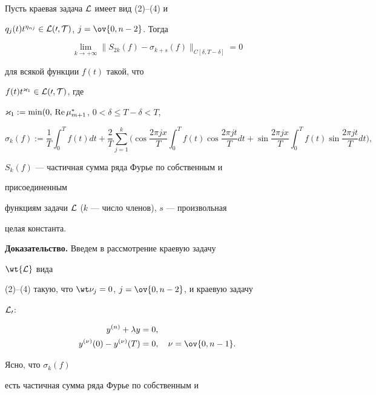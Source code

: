 \begin{cornonum}


Пусть краевая задача $\cal L$ имеет вид (2)--(4) и


$q_j(t)t^{\eta_{nj}}\in\cal L(0,T)$, $j=\ov{0,n-2}$. Тогда


$$


\lim_{k\to +\infty}\|S_{2k}(f)-


\sigma_{k+s}(f)\|_{C[\delta,T-\delta]}=0


$$


для всякой функции $f(t)$ такой, что


$f(t)t^{\varkappa_1}\in\cal L(0,T)$, где


$\varkappa_1:=\min(0,\,\operatorname{Re}\mu^*_{m+1}$, $0<\delta\le T-\delta<T$,


$$


\sigma_k(f):=\frac{1}{T}\int^T_0 f(t)dt+


\frac{2}{T}\sum^k_{j=1}\biggl(\cos\frac{2\pi jx}{T}


\int^T_0 f(t)\cos\frac{2\pi jt}{T}dt+


\sin\frac{2\pi jx}{T}\int^T_0 f(t)\sin\frac{2\pi jt}{T}dt


\biggr),


$$


$S_k(f)$ --- частичная сумма ряда Фурье по собственным и


присоединенным


функциям задачи $\cal L$ ($k$ --- число членов), $s$ --- произвольная


целая константа.


\end{cornonum}





{\bf Доказательство.} Введем в рассмотрение краевую задачу


$\wt{\cal L}$ вида


(2)--(4) такую, что $\wt\nu_j=0$, $j=\ov{0,n-2}$, и краевую задачу


$\cal L_0$:


\begin{align*}


y^{(n)}+\lambda y& =0,\\


y^{(\nu)}(0)-y^{(\nu)}(T)& =0,\quad \nu=\ov{0,n-1}.


\end{align*}


Ясно, что $\sigma_k(f)$


есть частичная сумма ряда Фурье по собственным и


